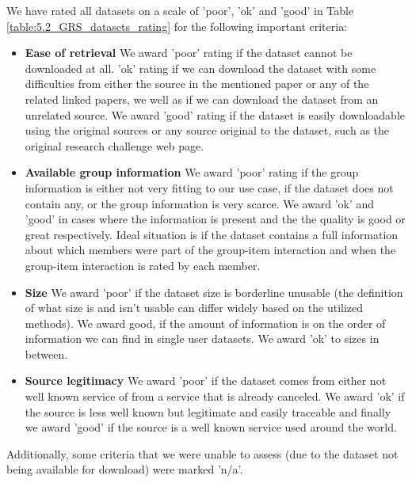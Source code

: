 We have rated all datasets on a scale of 'poor', 'ok' and 'good' in Table \ref{table:5.2_GRS_datasets_rating} for the following important criteria:
\begin{itemize}
    \item \textbf{Ease of retrieval} \newline
        We award 'poor' rating if the dataset cannot be downloaded at all. 'ok' rating if we can download the dataset with some difficulties from either the source in the mentioned paper or any of the related linked papers, we well as if we can download the dataset from an unrelated source. We award 'good' rating if the dataset is easily downloadable using the original sources or any source original to the dataset, such as the original research challenge web page.
    \item \textbf{Available group information} \newline
        We award 'poor' rating if the group information is either not very fitting to our use case, if the dataset does not contain any, or the group information is very scarce. We award 'ok' and 'good' in cases where the information is present and the the quality is good or great respectively. Ideal situation is if the dataset contains a full information about which members were part of the group-item interaction and when the group-item interaction is rated by each member.
    \item \textbf{Size}\newline
        We award 'poor' if the dataset size is borderline unusable (the definition of what size is and isn't usable can differ widely based on the utilized methods). We award good, if the amount of information is on the order of information we can find in single user datasets. We award 'ok' to sizes in between.
    \item \textbf{Source legitimacy} \newline
        We award 'poor' if the dataset comes from either not well known service of from a service that is already canceled. We award 'ok' if the source is less well known but legitimate and easily traceable and finally we award 'good' if the source is a well known service used around the world.
\end{itemize}

Additionally, some criteria that we were unable to assess (due to the dataset not being available for download) were marked 'n/a'.

